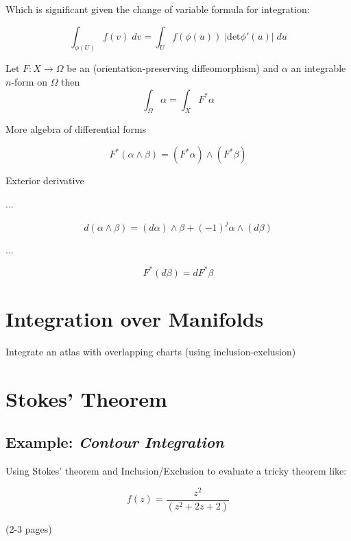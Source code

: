 Which is significant given the change of variable formula for integration:

\begin{equation}
\int_{\phi(U)} \! f(v) \; dv = \int_U \! f(\phi(u)) \; |\text{det}\phi'(u)| \; du
\end{equation}

\begin{theorem}
Let $F : X  \to \Omega$ be an (orientation-preserving diffeomorphism) and $\alpha$ an integrable $n$-form on $\Omega$ then
\begin{equation}
\int_\Omega \alpha = \int_X F^* \alpha
\end{equation}
\end{theorem}

More algebra of differential forms

\begin{equation}
F^* (\alpha \wedge \beta ) = (F^* \alpha) \wedge (F^* \beta)
\end{equation}

\begin{definition}
Exterior derivative
\end{definition}

...

\begin{equation}
d(\alpha \wedge \beta) = (d \alpha) \wedge \beta + (-1)^j \alpha \wedge ( d \beta)
\end{equation}

...

\begin{equation}
F^* (d \beta ) = dF^* \beta
\end{equation}

\section{Integration over Manifolds}

\begin{example}
Integrate an atlas with overlapping charts (using inclusion-exclusion)
\end{example}
\newpage

\section{Stokes' Theorem}



\subsection{Example: \emph{Contour Integration}}

Using Stokes' theorem and Inclusion/Exclusion to evaluate a tricky theorem like:

\begin{equation}
f(z) = \frac{z^2}{(z^2 + 2z + 2)}
\end{equation}


 (2-3 pages)

\newpage

